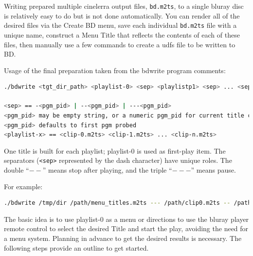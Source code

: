 Writing prepared multiple cinelerra output files, \texttt{bd.m2ts}, to a single bluray disc is relatively easy to do but is not done automatically.  You can render all of the desired files via the Create BD menu, save each individual \texttt{bd.m2ts} file with a unique name, construct a Menu Title that reflects the contents of each of these files, then manually use a few commands to create a udfs file to be written to BD.

Usage of the final preparation taken from the bdwrite program comments:

\begin{lstlisting}[language=bash,numbers=none]
./bdwrite <tgt_dir_path> <playlist-0> <sep> <playlistp1> <sep> ... <sep> <playlist-n>

<sep> == -<pgm_pid> | --<pgm_pid> | ---<pgm_pid>
<pgm_pid> may be empty string, or a numeric pgm_pid for current title clip
<pgm_pid> defaults to first pgm probed
<playlist-x> == <clip-0.m2ts> <clip-1.m2ts> ... <clip-n.m2ts>
\end{lstlisting}

One title is built for each playlist; playlist-0 is used as first-play item.  The separators (\texttt{<sep>} represented by the dash character) have unique roles.  The double “$--$” means stop after playing, and the triple “$---$” means pause.

For example:

\begin{lstlisting}[language=bash,numbers=none]
./bdwrite /tmp/dir /path/menu_titles.m2ts --- /path/clip0.m2ts -- /path/clip1.m2ts -- /path/clip2.m2ts
\end{lstlisting}

The basic idea is to use playlist-0 as a menu or directions to use the bluray player remote control to select the desired Title and start the play, avoiding the need for a menu system.  Planning in advance to get the desired results is necessary.  The following steps provide an outline to get started.

